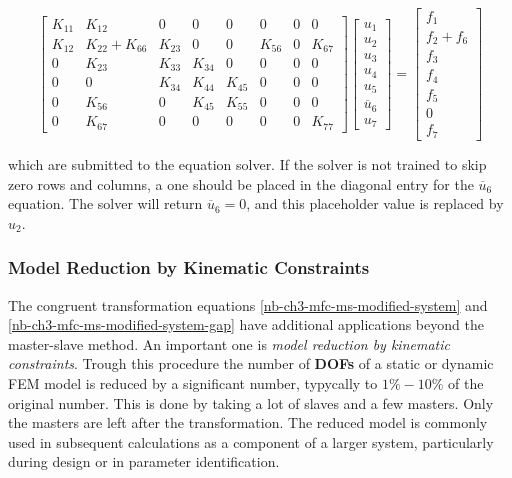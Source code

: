 \begin{equation}
    \begin{bmatrix}
        K_{11} & K_{12} & 0 & 0 & 0 & 0 & 0 & 0 \\
        K_{12} & K_{22} + K_{66} & K_{23} & 0 & 0 & K_{56} & 0 & K_{67} \\
        0 & K_{23} & K_{33} & K_{34} & 0 & 0 & 0 & 0 \\
        0 & 0 & K_{34} & K_{44} & K_{45} & 0 & 0 & 0 \\
        0 & K_{56} & 0 & K_{45} & K_{55} & 0 & 0 & 0 \\
        0 & K_{67} & 0 & 0 & 0 & 0 & 0 & K_{77}
    \end{bmatrix}
    \begin{bmatrix}
        u_1 \\
        u_2 \\
        u_3 \\
        u_4 \\
        u_5 \\
        \overline{u}_6 \\
        u_7
    \end{bmatrix}
    = \begin{bmatrix}
        f_1 \\
        f_2 + f_6 \\
        f_3 \\
        f_4 \\
        f_5 \\
        0 \\
        f_7
    \end{bmatrix}
\end{equation}

which are submitted to the equation solver. If the solver is not trained to skip
zero rows and columns, a one should be placed in the diagonal entry for the
$ \overline{u}_6 $ equation. The solver will return $ \overline{u}_6 = 0 $,
and this placeholder value is replaced by $ u_2 $.


\subsubsection{Model Reduction by Kinematic Constraints}

The congruent transformation equations \eqref{nb-ch3-mfc-ms-modified-system}
and \eqref{nb-ch3-mfc-ms-modified-system-gap} have additional applications beyond the
master-slave method. An important one is \textit{model reduction by kinematic constraints}.
Trough this procedure the number of \textbf{DOFs} of a static or dynamic FEM model
is reduced by a significant number, typycally to $ 1 \% - 10 \% $ of the original number.
This is done by taking a lot of slaves and a few masters. Only the masters are left
after the transformation. The reduced model is commonly used in subsequent calculations
as a component of a larger system, particularly during design or in parameter
identification.


